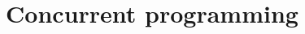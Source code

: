 \documentclass{article}
\begin{document}
\title{Concurrent programming}
\author{}
\date{}

\maketitle


\end{document}
